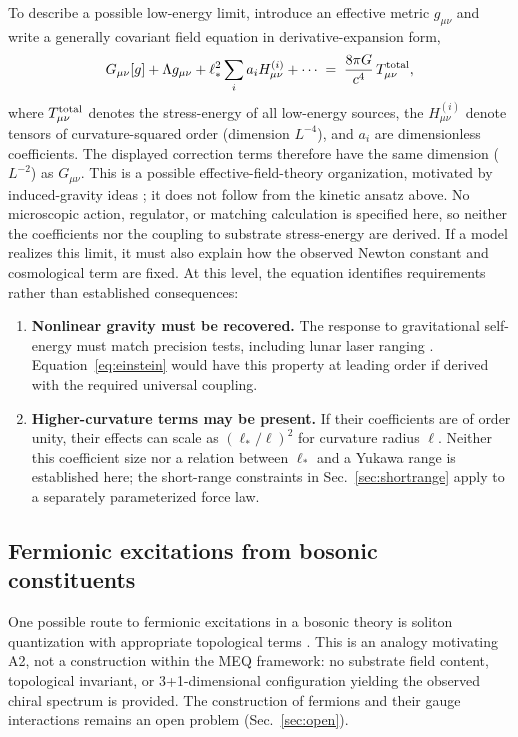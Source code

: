 \documentclass[11pt,a4paper]{article}
\newcommand{\meq}{MEQ}
\begin{document}
To describe a possible low-energy limit, introduce an effective metric $g_{\mu\nu}$ and write a
generally covariant field equation in derivative-expansion form,
\begin{equation}
G_{\mu\nu}[g] + \Lambda g_{\mu\nu}
+ \ell_\ast^2 \sum_i a_i H_{\mu\nu}^{(i)} + \cdots
\;=\; \frac{8\pi G}{c^{4}}\,T_{\mu\nu}^{\rm total},
\label{eq:einstein}
\end{equation}
where $T_{\mu\nu}^{\rm total}$ denotes the stress-energy of all low-energy sources, the
$H_{\mu\nu}^{(i)}$ denote tensors of curvature-squared order (dimension $L^{-4}$), and $a_i$ are
dimensionless coefficients. The displayed correction terms therefore have the same dimension
($L^{-2}$) as $G_{\mu\nu}$. This is a possible effective-field-theory organization, motivated by
induced-gravity ideas \cite{Sakharov1968,Donoghue1994}; it does not follow from the kinetic ansatz
above. No microscopic action, regulator, or matching calculation is specified here, so neither
the coefficients nor the coupling to substrate stress-energy are derived. If a model realizes
this limit, it must also explain how the observed Newton constant and cosmological term are fixed.
At this level, the equation identifies requirements rather than established consequences:
\begin{enumerate}
\item \textbf{Nonlinear gravity must be recovered.} The response to gravitational self-energy
must match precision tests, including lunar laser ranging \cite{Williams2004}. Equation~\eqref{eq:einstein} would have this property at leading order if derived with the required
universal coupling.
\item \textbf{Higher-curvature terms may be present.} If their coefficients are of order unity,
their effects can scale as $(\ell_\ast/\ell)^2$ for curvature radius $\ell$. Neither this
coefficient size nor a relation between $\ell_\ast$ and a Yukawa range is established here; the
short-range constraints in Sec.~\ref{sec:shortrange} apply to a separately parameterized force
law.
\end{enumerate}

\subsection{Fermionic excitations from bosonic constituents}\label{sec:fermions}

One possible route to fermionic excitations in a bosonic theory is soliton quantization with
appropriate topological terms \cite{Skyrme1962,Goldstone1981}. This is an analogy motivating A2,
not a construction within the \meq{} framework: no substrate field content, topological invariant,
or 3+1-dimensional configuration yielding the observed chiral spectrum is provided. The
construction of fermions and their gauge interactions remains an open problem (Sec.~\ref{sec:open}).
\end{document}
